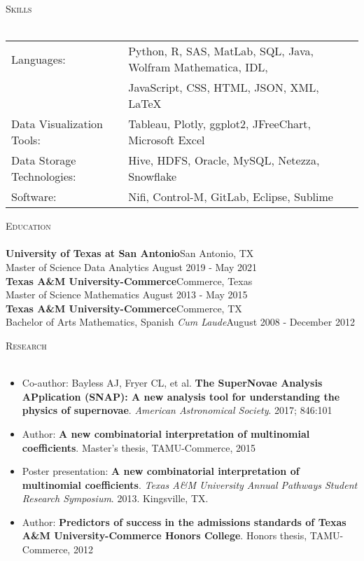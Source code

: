 \documentclass[a4paper]{article}
\newcommand{\lineunder} {
    \vspace*{-8pt} \\
    \hspace*{-18pt} \hrulefill \\
}
\newcommand{\header} [1] {
    {\hspace*{-18pt}\vspace*{6pt} \textsc{#1}}
    \vspace*{-6pt} \lineunder
}
\begin{document}
\header{Skills}
\begin{tabular}{ l l }
	Languages: & Python, R, SAS, MatLab, SQL, Java, Wolfram Mathematica, IDL,\\
								& JavaScript, CSS, HTML, JSON, XML, LaTeX \\
	Data Visualization Tools:             & Tableau, Plotly, ggplot2, JFreeChart, Microsoft Excel                                       \\
	Data Storage Technologies:            & Hive, HDFS, Oracle, MySQL, Netezza, Snowflake                                                                     \\
	Software:                             & Nifi, Control-M, GitLab, Eclipse, Sublime                                            \\
\end{tabular}
\vspace{2mm}

\header{Education}
\textbf{University of Texas at San Antonio}\hfill San Antonio, TX\\
Master of Science Data Analytics \hfill August 2019 - May 2021\\
\vspace{2mm}
\textbf{Texas A\&M University-Commerce}\hfill Commerce, Texas\\
Master of Science Mathematics \hfill August 2013 - May 2015\\
\vspace{2mm}
\textbf{Texas A\&M University-Commerce}\hfill Commerce, TX\\
Bachelor of Arts Mathematics, Spanish \textit{Cum Laude}\hfill August 2008 - December 2012\\
\vspace{2mm}

\header{Research}
\begin{itemize} \itemsep .5pt
	\item Co-author: Bayless AJ, Fryer CL, et al. \textbf{The SuperNovae Analysis APplication (SNAP): A new analysis tool for understanding the physics of supernovae}. \textit{American Astronomical Society}. 2017; 846:101
	\item Author: \textbf{A new combinatorial interpretation of multinomial coefficients}. Master's thesis, TAMU-Commerce, 2015
	\item Poster presentation: \textbf{A new combinatorial interpretation of multinomial coefficients}. \textit{Texas A\&M University Annual Pathways Student Research Symposium}. 2013. Kingsville, TX.
	\item Author: \textbf{Predictors of success in the admissions standards of Texas A\&M University-Commerce Honors College}. Honors thesis, TAMU-Commerce, 2012
\end{itemize}
\vspace{2mm}
\end{document}
